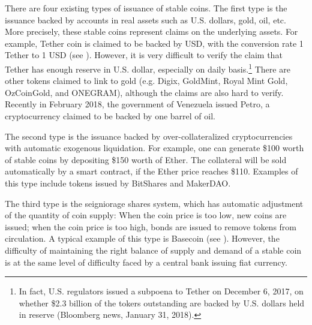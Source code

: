 \documentclass[draft, noinfoline]{ectaart}
\numberwithin{equation}{section}
\theoremstyle{plain}
\begin{document}




There are four existing types of issuance of stable coins. The first type is the issuance backed by accounts in real assets such as U.S. dollars, gold, oil, etc. More precisely, these stable coins represent claims on the underlying assets. For example, Tether coin is claimed to be backed by USD, with the conversion rate  1 Tether to 1 USD (see \cite{tether_tether:_2016}). However, it is very difficult to verify the claim that Tether has enough reserve in U.S. dollar, especially on daily basis.\footnote{
In fact, U.S. regulators issued a subpoena to Tether on December 6, 2017, on whether \$2.3 billion of the tokers outstanding are backed by U.S. dollars held in reserve (Bloomberg news, January 31, 2018).}
There are other tokens claimed to link to gold (e.g. Digix, GoldMint, Royal Mint Gold, OzCoinGold, and ONEGRAM), although the claims are also hard to verify. Recently in February 2018, the government of Venezuela issued Petro, a cryptocurrency claimed to be backed by one barrel of oil.

The second type is the issuance backed by over-collateralized cryptocurrencies with automatic exogenous liquidation. For example, one can generate \$100 worth of stable coins by depositing \$150 worth of Ether. The collateral will be sold automatically by a smart contract, if the Ether price reaches \$110. Examples of this type include tokens issued by BitShares and MakerDAO.

The third type is the seigniorage shares system, which has automatic adjustment of the quantity of coin supply: When the coin price is too low, new coins are issued; when the coin price is too high, bonds are issued to remove tokens from circulation. A typical example of this type is Basecoin (see \cite{al-naji_basecoin:_2018}). However, the difficulty of maintaining the right balance of supply and demand of a stable coin is at the same level of difficulty faced by a central bank issuing fiat currency.
\end{document}
